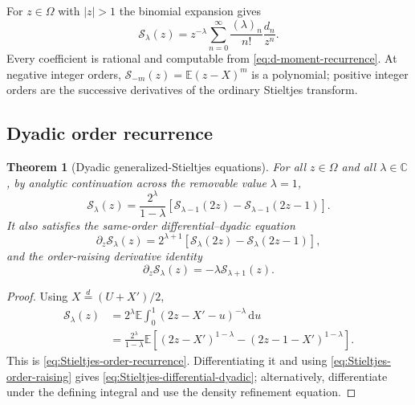 \documentclass[11pt,oneside]{article}
\newtheorem{theorem}{Theorem}[section]
\theoremstyle{definition}
\theoremstyle{remark}
\newcommand{\C}{\mathbb C}
\newcommand{\E}{\mathbb E}
\newcommand{\dd}{\,\mathrm d}
\newcommand{\poch}[2]{\left(#1\right)_{#2}}
\newcommand{\Sord}{\mathcal S}
\begin{document}
For $z\in\Omega$ with $|z|>1$ the binomial expansion gives
\begin{equation}
 \Sord_\lambda(z)
 =z^{-\lambda}\sum_{n=0}^{\infty}
  \frac{\poch{\lambda}{n}}{n!}\frac{d_n}{z^n}.
 \label{eq:Stieltjes-moment-series}
\end{equation}
Every coefficient is rational and computable from
\eqref{eq:d-moment-recurrence}.  At negative integer orders,
$\Sord_{-m}(z)=\E(z-X)^m$ is a polynomial; positive integer orders are the
successive derivatives of the ordinary Stieltjes transform.

\subsection{Dyadic order recurrence}

\begin{theorem}[Dyadic generalized-Stieltjes equations]
\label{thm:Stieltjes-dyadic}
For all $z\in\Omega$ and all $\lambda\in\C$, by analytic continuation across
the removable value $\lambda=1$,
\begin{equation}
 \Sord_\lambda(z)
 =\frac{2^\lambda}{1-\lambda}
  \left[\Sord_{\lambda-1}(2z)
       -\Sord_{\lambda-1}(2z-1)\right].
 \label{eq:Stieltjes-order-recurrence}
\end{equation}
It also satisfies the same-order differential--dyadic equation
\begin{equation}
 \partial_z\Sord_\lambda(z)
 =2^{\lambda+1}
  \left[\Sord_\lambda(2z)-\Sord_\lambda(2z-1)\right],
 \label{eq:Stieltjes-differential-dyadic}
\end{equation}
and the order-raising derivative identity
\begin{equation}
 \partial_z\Sord_\lambda(z)=-\lambda\Sord_{\lambda+1}(z).
 \label{eq:Stieltjes-order-raising}
\end{equation}
\end{theorem}

\begin{proof}
Using $X\overset d=(U+X')/2$,
\begin{align}
 \Sord_\lambda(z)
 &=2^\lambda\E\int_0^1(2z-X'-u)^{-\lambda}\dd u\\
 &=\frac{2^\lambda}{1-\lambda}
   \E\left[(2z-X')^{1-\lambda}
          -(2z-1-X')^{1-\lambda}\right].
\end{align}
This is \eqref{eq:Stieltjes-order-recurrence}.  Differentiating it and using
\eqref{eq:Stieltjes-order-raising} gives
\eqref{eq:Stieltjes-differential-dyadic}; alternatively, differentiate under
the defining integral and use the density refinement equation.
\end{proof}
\end{document}
